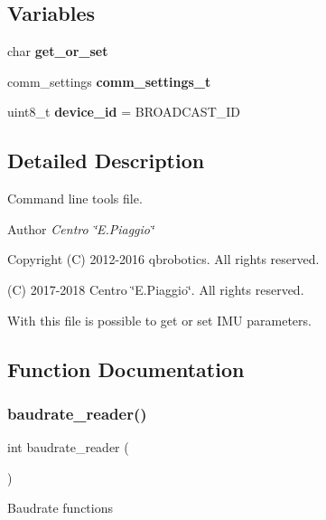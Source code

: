 \subsection*{Variables}
\begin{DoxyCompactItemize}
\item 
\mbox{\label{nmmi__param__imu_8c_a3c28322a1b5922f8c61d7cb3723b56b1}} 
char {\bfseries get\+\_\+or\+\_\+set}
\item 
\mbox{\label{nmmi__param__imu_8c_a92153f4b70cd8ba4e9b502ccff8d28bf}} 
comm\+\_\+settings {\bfseries comm\+\_\+settings\+\_\+t}
\item 
\mbox{\label{nmmi__param__imu_8c_aebf6cf4331fcc15f0d3ed0890e01a380}} 
uint8\+\_\+t {\bfseries device\+\_\+id} = B\+R\+O\+A\+D\+C\+A\+S\+T\+\_\+\+ID
\end{DoxyCompactItemize}


\subsection{Detailed Description}
Command line tools file. 

\begin{DoxyAuthor}{Author}
{\itshape Centro \char`\"{}\+E.\+Piaggio\char`\"{}} 
\end{DoxyAuthor}
\begin{DoxyCopyright}{Copyright}
(C) 2012-\/2016 qbrobotics. All rights reserved. 

(C) 2017-\/2018 Centro \char`\"{}\+E.\+Piaggio\char`\"{}. All rights reserved.
\end{DoxyCopyright}
With this file is possible to get or set I\+MU parameters. 

\subsection{Function Documentation}
\mbox{\label{nmmi__param__imu_8c_a872d84bb02f7d8f4617246f0c6d37c43}} 
\subsubsection{baudrate\+\_\+reader()}
{\footnotesize\ttfamily int baudrate\+\_\+reader (\begin{DoxyParamCaption}{ }\end{DoxyParamCaption})}

Baudrate functions 